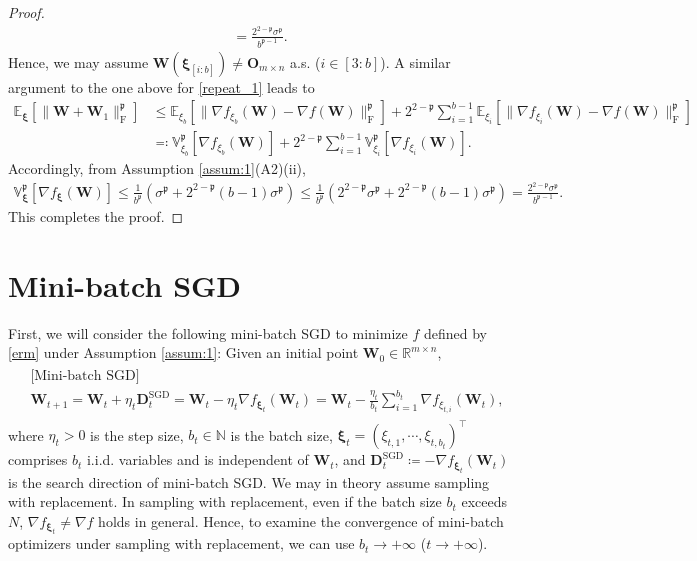 \documentclass[twoside,11pt]{article}
\begin{document}
\begin{proof}
\begin{align*}
= 
\frac{2^{2 - \mathfrak{p}} \sigma^{\mathfrak{p}}}{b^{\mathfrak{p}-1}}.
\end{align*}
Hence, we may assume $\bm{W}(\bm{\xi}_{[i : b]}) \neq \bm{O}_{m \times n}$ a.s. ($i \in [3:b]$). A similar argument to the one above for \eqref{repeat_1} leads to 
\begin{align*}
\mathbb{E}_{\bm{\xi}} [\|\bm{W} + \bm{W}_1 \|_{\mathrm{F}}^{\mathfrak{p}}]
&\leq
\mathbb{E}_{\xi_b} [\| \nabla f_{\xi_{b}}(\bm{W}) - \nabla f (\bm{W}) \|_{\mathrm{F}}^{\mathfrak{p}} ]
+ 2^{2 - \mathfrak{p}} \sum_{i=1}^{b-1} \mathbb{E}_{\xi_{i}} [\|\nabla f_{\xi_{i}}(\bm{W}) - \nabla f (\bm{W})\|_{\mathrm{F}}^{\mathfrak{p}}]\\
&\eqqcolon
\mathbb{V}_{\xi_b}^{\mathfrak{p}} [ \nabla f_{\xi_{b}}(\bm{W}) ]
+ 
2^{2 - \mathfrak{p}} \sum_{i=1}^{b-1} \mathbb{V}_{\xi_i}^{\mathfrak{p}} [ \nabla f_{\xi_{i}}(\bm{W}) ].
\end{align*}
Accordingly, from Assumption \ref{assum:1}(A2)(ii),
\begin{align*}
\mathbb{V}_{\bm{\xi}}^{\mathfrak{p}}[\nabla f_{\bm{\xi}} (\bm{W})]
\leq 
\frac{1}{b^{\mathfrak{p}}}
\left( \sigma^{\mathfrak{p}} + 2^{2 - \mathfrak{p}} (b-1) \sigma^{\mathfrak{p}} \right)
\leq 
\frac{1}{b^{\mathfrak{p}}}
\left( 2^{2 - \mathfrak{p}} \sigma^{\mathfrak{p}} + 2^{2 - \mathfrak{p}} (b-1) \sigma^{\mathfrak{p}} \right)
= 
\frac{2^{2 - \mathfrak{p}} \sigma^{\mathfrak{p}}}{b^{\mathfrak{p}-1}}.
\end{align*}
This completes the proof.
\end{proof}

\section{Mini-batch SGD}
\label{sec:3}
First, we will consider the following mini-batch SGD to minimize $f$ defined by \eqref{erm} under Assumption \ref{assum:1}: Given an initial point $\bm{W}_0 \in \mathbb{R}^{m \times n}$,
\begin{align}\label{SGD}
\begin{split}
&\text{[Mini-batch SGD]}\\
&\bm{W}_{t+1} 
= \bm{W}_t + \eta_t \bm{D}_t^{\mathrm{SGD}}
= \bm{W}_t - \eta_t \nabla f_{\bm{\xi}_t} (\bm{W}_t) 
= \bm{W}_t - \frac{\eta_t}{b_t} \sum_{i=1}^{b_t} \nabla f_{\xi_{t,i}} (\bm{W}_t),
\end{split}
\end{align}
where $\eta_t > 0$ is the step size, $b_t \in \mathbb{N}$ is the batch size, $\bm{\xi}_t = (\xi_{t,1}, \cdots, \xi_{t, b_t})^\top$ comprises $b_t$ i.i.d. variables and is independent of $\bm{W}_t$, and $\bm{D}_t^{\mathrm{SGD}} \coloneqq - \nabla f_{\bm{\xi}_t} (\bm{W}_t)$ is the search direction of mini-batch SGD. We may in theory assume sampling with replacement. In sampling with replacement, even if the batch size $b_t$ exceeds $N$, $\nabla f_{\bm{\xi}_t} \neq \nabla f$ holds in general. Hence, to examine the convergence of mini-batch optimizers under sampling with replacement, we can use $b_t \to + \infty$ ($t \to + \infty$).
\end{document}
